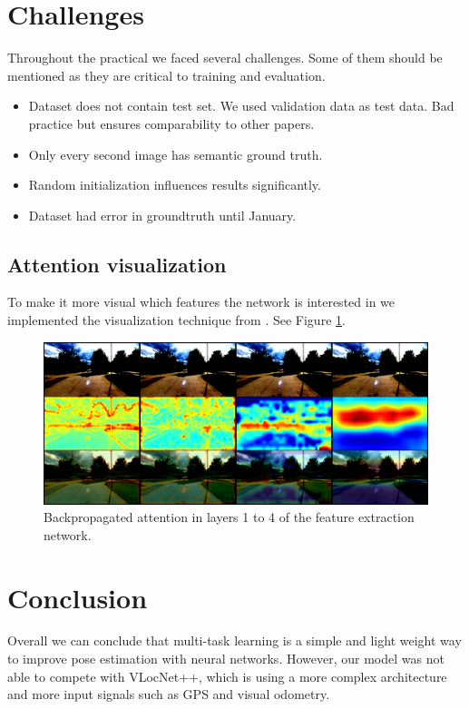 \documentclass[10pt,twocolumn,letterpaper]{article}
\begin{document}
\section{Challenges}
Throughout the practical we faced several challenges. Some of them should be mentioned as they are critical to training and evaluation. 
\begin{itemize}[noitemsep,topsep=1pt]
	\item Dataset does not contain test set. We used validation data as test data. Bad practice but ensures comparability to other papers.
	\item Only every second image has semantic ground truth.
	\item Random initialization influences results significantly.
	\item Dataset had error in groundtruth until January.
\end{itemize}

\subsection{Attention visualization}
To make it more visual which features the network is interested in we implemented the visualization technique from \cite{chattopadhay2018grad}. See Figure \ref{fig:attention_map}.
\begin{figure}[t]
\begin{center}
   \includegraphics[width=0.8\linewidth]{images/activation_maps_multitask_layer1,layer2,layer3,layer4.png}
\end{center}
   \caption{Backpropagated attention in layers 1 to 4 of the feature extraction network.}
\label{fig:attention_map}
\end{figure}

\section{Conclusion}
Overall we can conclude that multi-task learning is a simple and light weight way to improve pose estimation with neural networks. However, our model was not able to compete with VLocNet++, which is using a more complex architecture and more input signals such as GPS and visual odometry.
\end{document}
